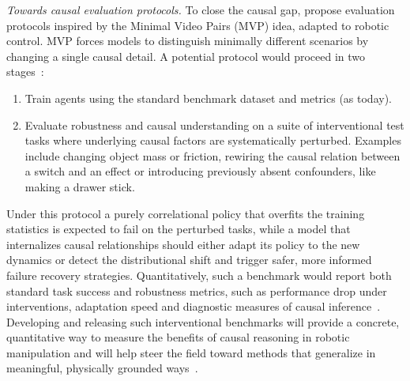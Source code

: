 \textit{Towards causal evaluation protocols.} To close the causal gap, \textcite{LopezPaz2016DiscoveringCS} propose evaluation protocols inspired by the Minimal Video Pairs (MVP) idea, adapted to robotic control. MVP forces models to distinguish minimally different scenarios by changing a single causal detail. 
A potential protocol would proceed in two stages~\cite{Eze2024LearningBW}:
\begin{enumerate}
    \item Train agents using the standard benchmark dataset and metrics (as today).
    \item Evaluate robustness and causal understanding on a suite of interventional test tasks where underlying causal factors are systematically perturbed. Examples include changing object mass or friction, rewiring the causal relation between a switch and an effect or introducing previously absent confounders, like making a drawer stick.
\end{enumerate}

Under this protocol a purely correlational policy that overfits the training statistics is expected to fail on the perturbed tasks, while a model that internalizes causal relationships should either adapt its policy to the new dynamics or detect the distributional shift and trigger safer, more informed failure recovery strategies. Quantitatively, such a benchmark would report both standard task success and robustness metrics, such as performance drop under interventions, adaptation speed and diagnostic measures of causal inference~\cite{Eze2024LearningBW}.
Developing and releasing such interventional benchmarks will provide a concrete, quantitative way to measure the benefits of causal reasoning in robotic manipulation and will help steer the field toward methods that generalize in meaningful, physically grounded ways~\cite{Eze2024LearningBW}.

